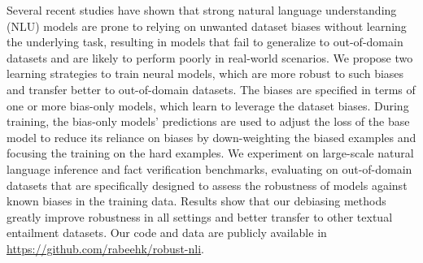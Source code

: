 Several recent studies have shown that strong natural language understanding (NLU) models are prone to relying on unwanted dataset biases without learning the underlying task, resulting in models that fail to generalize to out-of-domain datasets and are likely to perform poorly in real-world scenarios. We propose two learning strategies to train neural models, which are more robust to such biases and transfer better to out-of-domain datasets. The biases are specified in terms of one or more bias-only models, which learn to leverage the dataset biases. During training, the bias-only models' predictions are used to adjust the loss of the base model to reduce its reliance on biases by down-weighting the biased examples and focusing the training on the hard examples. We experiment on large-scale natural language inference and fact verification benchmarks, evaluating on out-of-domain datasets that are specifically designed to assess the robustness of models against known biases in the training data. Results show that our debiasing methods greatly improve robustness in all settings and better transfer to other textual entailment datasets. Our code and data are publicly available in \url{https://github.com/rabeehk/robust-nli}.
